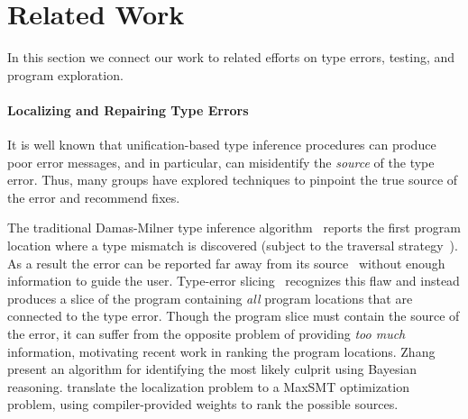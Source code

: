 \section{Related Work}
\label{sec:related-work}
In this section we connect our work to related efforts on type errors,
testing, and program exploration.


\paragraph{Localizing and Repairing Type Errors}
\label{sec:diagnosis-repair}
It is well known that unification-based type inference procedures can
produce poor error messages, and in particular, can misidentify the
\emph{source} of the type error.
%
Thus, many groups have explored techniques to pinpoint the true source
of the error and recommend fixes.

The traditional Damas-Milner type inference
algorithm~\cite{Damas1982-uw} reports the first program location where a
type mismatch is discovered (subject to the traversal
strategy~\cite{Lee1998-ys}).
%
As a result the error can be reported far away from its
source~\cite{McAdam1998-ub} without enough information to guide the
user.
%
Type-error slicing~\cite{Haack2003-vc,Schilling2011-yf,Rahli2015-tt,Sagonas2013-bf,Gast2004-zd,Neubauer2003-xv}
recognizes this flaw and instead produces a slice of the program
containing \emph{all} program locations that are connected to the type
error.
%
%
Though the program slice must contain the source of the error, it can
suffer from the opposite problem of providing \emph{too much}
information, motivating recent work in ranking the program locations.
%
Zhang~\etal~\cite{Zhang2014-lv,Zhang2015-yu} present an algorithm for
identifying the most likely culprit using Bayesian reasoning.
%
\citet{Pavlinovic2014-mr,Pavlinovic2015-kh} translate the %
localization problem to a MaxSMT optimization problem, using
compiler-provided weights to rank the possible sources.

